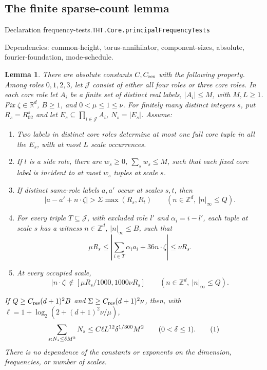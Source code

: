 \documentclass[11pt]{article}
\newtheorem{lemma}[theorem]{Lemma}
\theoremstyle{definition}
\newcommand{\R}{\mathbb R}
\newcommand{\Z}{\mathbb Z}
\newcommand{\eqtag}[1]{\refstepcounter{equation}\tag{\theequation}\label{#1}}
\numberwithin{equation}{section}
\newcommand{\bp}[3]{\par\smallskip\begingroup\footnotesize
\noindent\hypertarget{bp:#1}{\textsf{Declaration #1.}}\quad\nolinkurl{#2}\par
\noindent\textsf{Dependencies:} #3.\par\endgroup\smallskip}
\begin{document}
\subsection*{The finite sparse-count lemma}
\bp{frequency-tests}{THT.Core.principalFrequencyTests}{common-height, torus-annihilator, component-sizes, absolute, fourier-foundation, mode-schedule}

\begin{lemma}\label{lem:sparse-count}
There are absolute constants $C,C_{\rm res}$ with the following property. Among roles $0,1,2,3$, let $\mathcal J$ consist of either all four roles or three core roles. In each core role let $A_i$ be a finite set of distinct real labels, $|A_i|\le M$, with $M,L\ge1$. Fix $\zeta\in\R^d$, $B\ge1$, and $0<\mu\le1\le\nu$. For finitely many distinct integers $s$, put $R_s=R_02^s$ and let $E_s\subseteq\prod_{i\in\mathcal J}A_i$, $N_s=|E_s|$. Assume:
\begin{enumerate}
\item Two labels in distinct core roles determine at most one full core tuple in all the $E_s$, with at most $L$ scale occurrences.
\item If $l$ is a side role, there are $w_s\ge0$, $\sum_sw_s\le M$, such that each fixed core label is incident to at most $w_s$ tuples at scale $s$.
\item If distinct same-role labels $a,a'$ occur at scales $s,t$, then
\[
 |a-a'+n\cdot\zeta|>\Sigma\max(R_s,R_t)\qquad(n\in\Z^d,\ |n|_\infty\le Q).
\]
\item For every triple $T\subseteq\mathcal J$, with excluded role $l'$ and $\alpha_i=i-l'$, each tuple at scale $s$ has a witness $n\in\Z^d$, $|n|_\infty\le B$, such that
\[
 \mu R_s\le\left|\sum_{i\in T}\alpha_i a_i+36n\cdot\zeta\right|\le\nu R_s.
\]
\item At every occupied scale,
\[
 |n\cdot\zeta|\notin[\mu R_s/1000,1000\nu R_s]\qquad(n\in\Z^d,\ |n|_\infty\le Q).
\]
\end{enumerate}
If $Q\ge C_{\rm res}(d+1)^2B$ and $\Sigma\ge C_{\rm res}(d+1)^2\nu$, then, with $\ell=1+\log_2(2+(d+1)^2\nu/\mu)$,
\[
 \sum_{s:N_s\le\delta M^2}N_s\le C\ell L^{12}\delta^{1/300}M^2
 \qquad(0<\delta\le1).
 \eqtag{eq:sparse-count}
\]
There is no dependence of the constants or exponents on the dimension, frequencies, or number of scales.
\end{lemma}
\end{document}
